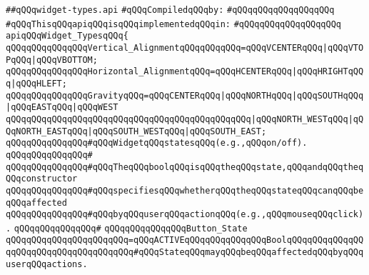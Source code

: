 \label{src/lib/x-kit/widget/old/basic/widget-types.api}
\verb|##qQQqwidget-types.api|\newline
\newline
\verb|#qQQqCompiledqQQqby:|\newline
\verb|#qQQqqQQqqQQqqQQqqQQq|\newline
\newline
\verb|#qQQqThisqQQqapiqQQqisqQQqimplementedqQQqin:|\newline
\verb|#qQQqqQQqqQQqqQQqqQQq|\newline
\newline
\verb|apiqQQqWidget_TypesqQQq{|\newline
\newline
\verb|qQQqqQQqqQQqqQQqVertical_AlignmentqQQqqQQqqQQq=qQQqVCENTERqQQq|\verb#|qQQqVTOPqQQq|qQQqVBOTTOM;#\newline
\verb|qQQqqQQqqQQqqQQqHorizontal_AlignmentqQQq=qQQqHCENTERqQQq|\verb#|qQQqHRIGHTqQQq|qQQqHLEFT;#\newline
\newline
\verb|qQQqqQQqqQQqqQQqGravityqQQq=qQQqCENTERqQQq|\verb#|qQQqNORTHqQQq|qQQqSOUTHqQQq|qQQqEASTqQQq|qQQqWEST#\newline
\verb|qQQqqQQqqQQqqQQqqQQqqQQqqQQqqQQqqQQqqQQqqQQqqQQq|\verb#|qQQqNORTH_WESTqQQq|qQQqNORTH_EASTqQQq|qQQqSOUTH_WESTqQQq|qQQqSOUTH_EAST;#\newline
\newline
\verb|qQQqqQQqqQQqqQQq#qQQqWidgetqQQqstatesqQQq(e.g.,qQQqon/off).|\newline
\verb|qQQqqQQqqQQqqQQq#|\newline
\verb|qQQqqQQqqQQqqQQq#qQQqTheqQQqboolqQQqisqQQqtheqQQqstate,qQQqandqQQqtheqQQqconstructor|\newline
\verb|qQQqqQQqqQQqqQQq#qQQqspecifiesqQQqwhetherqQQqtheqQQqstateqQQqcanqQQqbeqQQqaffected|\newline
\verb|qQQqqQQqqQQqqQQq#qQQqbyqQQquserqQQqactionqQQq(e.g.,qQQqmouseqQQqclick).|\newline
\verb|qQQqqQQqqQQqqQQq#|\newline
\verb|qQQqqQQqqQQqqQQqButton_State|\newline
\verb|qQQqqQQqqQQqqQQqqQQqqQQq=qQQqACTIVEqQQqqQQqqQQqqQQqBoolqQQqqQQqqQQqqQQqqQQqqQQqqQQqqQQqqQQqqQQq#qQQqStateqQQqmayqQQqbeqQQqaffectedqQQqbyqQQquserqQQqactions.|\newline

